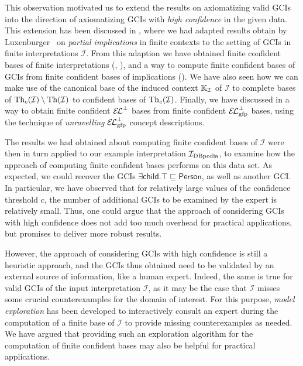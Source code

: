 This observation motivated us to extend the results on axiomatizing valid GCIs into the
direction of axiomatizing GCIs with \emph{high confidence} in the given data.  This
extension has been discussed in , where we had adapted results
obtain by Luxenburger~\cite{diss:Luxenburger} on \emph{partial implications} in finite
contexts to the setting of GCIs in finite interpretations $\mathcal{I}$.  From this
adaption we have obtained finite confident bases of finite interpretations
(, ), and a way to compute finite
confident bases of GCIs from finite confident bases of implications
().  We have also
seen how we can make use of the canonical base of the induced context ${\mathbb{K}}_{\mathcal{I}}$ of $\mathcal{I}$ to complete bases of $\operatorname{Th}_{c}(\mathcal{I}) \setminus
\operatorname{Th}(\mathcal{I})$ to confident bases of $\operatorname{Th}_{c}(\mathcal{I})$.  Finally, we have
discussed in  a way to obtain finite confident ${{\mathcal{E}\kern-.3ex\mathcal{L}}^\bot}$ bases
from finite confident $\ELgfpbot$ bases, using the technique of \emph{unravelling}
$\ELgfpbot$ concept descriptions.

The results we had obtained about computing finite confident bases of $\mathcal{I}$ were
then in turn applied to our example interpretation ${\mathcal{I}_{\text{DBpedia}}}$, to examine how the
approach of computing finite confident bases performs on this data set.  As expected, we
could recover the GCIs $\exists \mathsf{child}. \top \sqsubseteq \mathsf{Person}$, as well
as another GCI.  In particular, we have observed that for relatively large values of the
confidence threshold $c$, the number of additional GCIs to be examined by the expert is
relatively small.  Thus, one could argue that the approach of considering GCIs with high
confidence does not add too much overhead for practical applications, but promises to
deliver more robust results.

However, the approach of considering GCIs with high confidence is still a heuristic
approach, and the GCIs thus obtained need to be validated by an external source of
information, like a human expert.  Indeed, the same is true for valid GCIs of the input
interpretation $\mathcal{I}$, as it may be the case that $\mathcal{I}$ misses some crucial
counterexamples for the domain of interest.  For this purpose, \emph{model exploration}
has been developed to interactively consult an expert during the computation of a finite
base of $\mathcal{I}$ to provide missing counterexamples as needed.  We have argued that
providing such an exploration algorithm for the computation of finite confident bases may
also be helpful for practical applications.

